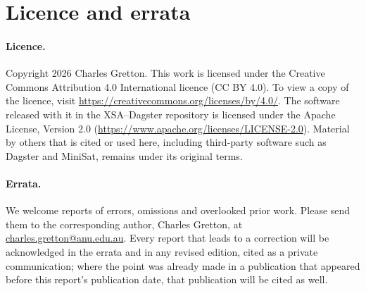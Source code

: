 \documentclass[11pt,a4paper]{article}
\begin{document}
\begin{abstract}
Reaching that result exposed three effects centred on Dagster's master and its allocation
policy:
\begin{itemize}[leftmargin=1.5em]
\item an expensive consistency check when combining partial results;
\item eager duplication of the only initial job to every idle worker;
\item serial processing of every duplicate's result.
\end{itemize}
All three were diagnosed from Dagster's own logs and avoided without modifying it. The
consistency check was disabled only for graphs whose combining inputs were verified to share
no variables. All 203 answers returned by 206 cluster runs were independently verified, and
every number in the results is regenerated from the archived raw results by published
scripts. A matched MiniSat portfolio and a direct, non-Dagster implementation of the same
decomposition have not yet been run. Together with start-up, the serial final step and
memory bandwidth, they are the main open questions.
\end{abstract}

\tableofcontents
\newpage

\section*{Licence and errata}

\paragraph{Licence.} Copyright 2026 Charles Gretton. This work is licensed under the Creative Commons
Attribution 4.0 International licence (CC BY 4.0). To view a copy of the licence, visit
\url{https://creativecommons.org/licenses/by/4.0/}. The software released with it in the XSA--Dagster
repository is licensed under the Apache License, Version 2.0
(\url{https://www.apache.org/licenses/LICENSE-2.0}). Material by others that is cited or used here,
including third-party software such as Dagster and MiniSat, remains under its original terms.

\paragraph{Errata.} We welcome reports of errors, omissions and overlooked prior work. Please send them to the
corresponding author, Charles Gretton, at \href{mailto:charles.gretton@anu.edu.au}{charles.gretton@anu.edu.au}.
Every report that leads to a correction will be acknowledged in the errata and in any revised edition,
cited as a private communication; where the point was already made in a publication that appeared before
this report's publication date, that publication will be cited as well.
\end{document}
